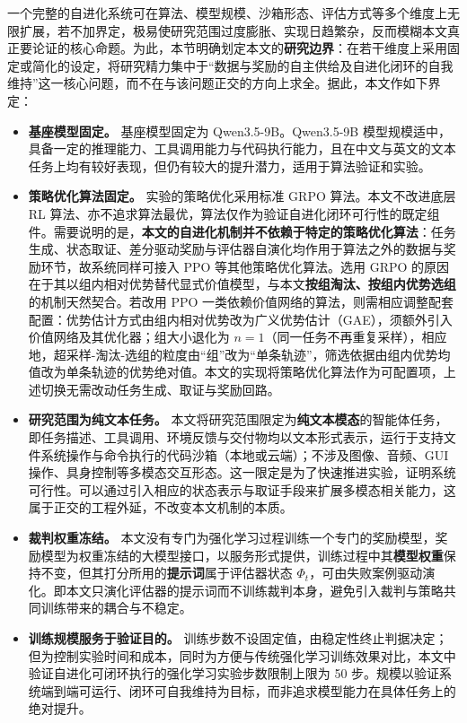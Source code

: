 一个完整的自进化系统可在算法、模型规模、沙箱形态、评估方式等多个维度上无限扩展，若不加界定，极易使研究范围过度膨胀、实现日趋繁杂，反而模糊本文真正要论证的核心命题。为此，本节明确划定本文的\textbf{研究边界}：在若干维度上采用固定或简化的设定，将研究精力集中于“数据与奖励的自主供给及自进化闭环的自我维持”这一核心问题，而不在与该问题正交的方向上求全。据此，本文作如下界定：

\begin{itemize}
    \item \textbf{基座模型固定。} 基座模型固定为 Qwen3.5-9B。Qwen3.5-9B 模型规模适中，具备一定的推理能力、工具调用能力与代码执行能力，且在中文与英文的文本任务上均有较好表现，但仍有较大的提升潜力，适用于算法验证和实验。
    \item \textbf{策略优化算法固定。} 实验的策略优化采用标准 GRPO 算法。本文不改进底层 RL 算法、亦不追求算法最优，算法仅作为验证自进化闭环可行性的既定组件。需要说明的是，\textbf{本文的自进化机制并不依赖于特定的策略优化算法}：任务生成、状态取证、差分驱动奖励与评估器自演化均作用于算法之外的数据与奖励环节，故系统同样可接入 PPO 等其他策略优化算法。选用 GRPO 的原因在于其以组内相对优势替代显式价值模型，与本文\textbf{按组淘汰、按组内优势选组}的机制天然契合。若改用 PPO 一类依赖价值网络的算法，则需相应调整配套配置：优势估计方式由组内相对优势改为广义优势估计（GAE），须额外引入价值网络及其优化器；组大小退化为 $n=1$（同一任务不再重复采样），相应地，超采样-淘汰-选组的粒度由“组”改为“单条轨迹”，筛选依据由组内优势均值改为单条轨迹的优势绝对值。本文的实现将策略优化算法作为可配置项，上述切换无需改动任务生成、取证与奖励回路。
    \item \textbf{研究范围为纯文本任务。} 本文将研究范围限定为\textbf{纯文本模态}的智能体任务，即任务描述、工具调用、环境反馈与交付物均以文本形式表示，运行于支持文件系统操作与命令执行的代码沙箱（本地或云端）；不涉及图像、音频、GUI 操作、具身控制等多模态交互形态。这一限定是为了快速推进实验，证明系统可行性。可以通过引入相应的状态表示与取证手段来扩展多模态相关能力，这属于正交的工程外延，不改变本文机制的本质。
    \item \textbf{裁判权重冻结。} 本文没有专门为强化学习过程训练一个专门的奖励模型，奖励模型为权重冻结的大模型接口，以服务形式提供，训练过程中其\textbf{模型权重}保持不变，但其打分所用的\textbf{提示词}属于评估器状态 $\Phi_t$，可由失败案例驱动演化。即本文只演化评估器的提示词而不训练裁判本身，避免引入裁判与策略共同训练带来的耦合与不稳定。
    \item \textbf{训练规模服务于验证目的。} 训练步数不设固定值，由稳定性终止判据决定；但为控制实验时间和成本，同时为方便与传统强化学习训练效果对比，本文中验证自进化可闭环执行的强化学习实验步数限制上限为 50 步。规模以验证系统端到端可运行、闭环可自我维持为目标，而非追求模型能力在具体任务上的绝对提升。
\end{itemize}

